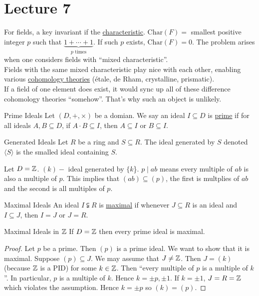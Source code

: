 \documentclass[twoside, openright, fontsize=10pt, headings=big]{scrbook}
\begin{document}
\chapter{Lecture 7}
For fields, a key invariant if the \underline{characteristic}. $\mathrm{Char}(F)=$ smallest positive integer $p$ such that $\underbrace{1+\cdots+1}_{p\text{ times}}$. If such $p$ exists, $\mathrm{Char}(F)=0$. The problem arises when one considers fields with ``mixed characteristic''.\\
Fields with the same mixed characteristic play nice with each other, enabling various \underline{cohomology theories} (\'etale, de Rham, crystalline, prismatic).\\
If a field of one element does exist, it would sync up all of these difference cohomology theories ``somehow''. That's why such an object is unlikely.\\
\begin{definition}{Prime Ideals}{}
    Let $(D,+,\times)$ be a domian. We say an ideal $I\subseteq D$ is \underline{prime} if for all ideals $A,B\subseteq D$, if $A\cdot B\subseteq I$, then $A\subseteq I$ or $B\subseteq I$.
\end{definition}
\begin{definition}{Generated Ideals}{}
    Let $R$ be a ring and $S\subseteq R$. The ideal generated by $S$ denoted $\langle S\rangle$ is the smalled ideal containing $S$.
\end{definition}
\begin{example}{}{}
    Let $D=\mathbb{Z}$. $(k)-$ ideal generated by $\{k$\}. $p\mid ab$ means every multiple of $ab$ is also a multiple of $p$. This implies that $(ab)\subseteq(p)$, the first is multplies of $ab$ and the second is all multiples of $p$.
\end{example}
\begin{definition}{Maximal Ideals}{}
    An ideal $I\subsetneqq R$ is \underline{maximal} if whenever $J\subseteq R$ is an ideal and $I\subseteq J$, then $I=J$ or $J=R$.
\end{definition}
\begin{proposition}{Maximal Ideals in $\mathbb{Z}$}{}
    If $D=\mathbb{Z}$ then every prime ideal is maximal.
\end{proposition}
\begin{proof}
    Let $p$ be a prime. Then $(p)$ is a prime ideal. We want to show that it is maximal. Suppose $(p)\subseteq J$. We may assume that $J\neq\mathbb{Z}$. Then $J=(k)$ (because $\mathbb{Z}$ is a PID) for some $k\in \mathbb{Z}$. Then ``every multiple of $p$ is a multiple of $k$''. In particular, $p$ is a multiple of $k$. Hence $k=\pm p,\pm1$. If $k=\pm1$, $J=R=\mathbb{Z}$ which violates the assumption. Hence $k=\pm p$ so $(k)=(p)$.
\end{proof}
\end{document}
